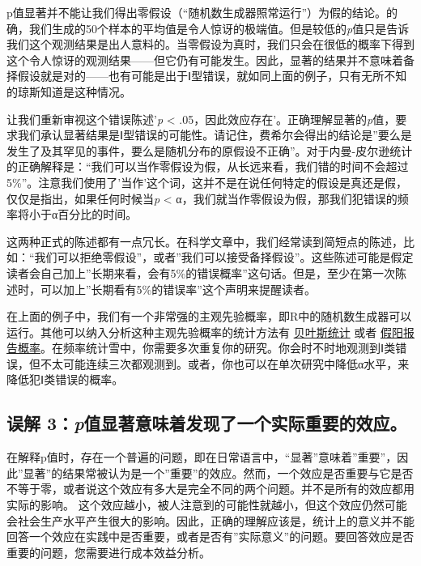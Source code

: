 \documentclass[
  letterpaper,
  DIV=11,
  numbers=noendperiod]{scrreprt}
\begin{document}
p值显著并不能让我们得出零假设（``随机数生成器照常运行''）为假的结论。的确，我们生成的50个样本的平均值是令人惊讶的极端值。但是较低的\emph{p}值只是告诉我们这个观测结果是出人意料的。当零假设为真时，我们只会在很低的概率下得到这个令人惊讶的观测结果------但它仍有可能发生。因此，显著的结果并不意味着备择假设就是对的------也有可能是出于Ⅰ型错误，就如同上面的例子，只有无所不知的琼斯知道是这种情况。

让我们重新审视这个错误陈述'\emph{p} \textless{}
.05，因此效应存在'。正确理解显著的\emph{p}值，要求我们承认显著结果是Ⅰ型错误的可能性。请记住，费希尔会得出的结论是''要么是发生了及其罕见的事件，要么是随机分布的原假设不正确''。对于内曼-皮尔逊统计的正确解释是：``我们可以当作零假设为假，从长远来看，我们错的时间不会超过5\%''。注意我们使用了'当作'这个词，这并不是在说任何特定的假设是真还是假，仅仅是指出，如果任何时候当\emph{p}
\textless{}
α，我们就当作零假设为假，那我们犯错误的频率将小于α百分比的时间。

这两种正式的陈述都有一点冗长。在科学文章中，我们经常读到简短点的陈述，比如：``我们可以拒绝零假设''，或者''我们可以接受备择假设''。这些陈述可能是假定读者会自己加上''长期来看，会有5\%的错误概率''这句话。但是，至少在第一次陈述时，可以加上''长期看有5\%的错误率''这个声明来提醒读者。

在上面的例子中，我们有一个非常强的主观先验概率，即R中的随机数生成器可以运行。其他可以纳入分析这种主观先验概率的统计方法有
\protect\hyperlink{bayes}{贝叶斯统计} 或者
\protect\hyperlink{ppv}{假阳报告概率}。在频率统计雪中，你需要多次重复你的研究。你会时不时地观测到Ⅰ类错误，但不太可能连续三次都观测到。或者，你也可以在单次研究中降低α水平，来降低犯Ⅰ类错误的概率。

\hypertarget{ux8befux89e3-3pux503cux663eux8457ux610fux5473ux7740ux53d1ux73b0ux4e86ux4e00ux4e2aux5b9eux9645ux91cdux8981ux7684ux6548ux5e94}{%
\subsection{\texorpdfstring{误解
3：\emph{p}值显著意味着发现了一个实际重要的效应。}{误解 3：p值显著意味着发现了一个实际重要的效应。}}\label{ux8befux89e3-3pux503cux663eux8457ux610fux5473ux7740ux53d1ux73b0ux4e86ux4e00ux4e2aux5b9eux9645ux91cdux8981ux7684ux6548ux5e94}}

在解释p值时，存在一个普遍的问题，即在日常语言中，``显著''意味着''重要''，因此''显著''的结果常被认为是一个''重要''的效应。然而，一个效应是否重要与它是否不等于零，或者说这个效应有多大是完全不同的两个问题。并不是所有的效应都用实际的影响。
这个效应越小，被人注意到的可能性就越小，但这个效应仍然可能会社会生产水平产生很大的影响。因此，正确的理解应该是，统计上的意义并不能回答一个效应在实践中是否重要，或者是否有''实际意义''的问题。要回答效应是否重要的问题，您需要进行成本效益分析。
\end{document}
